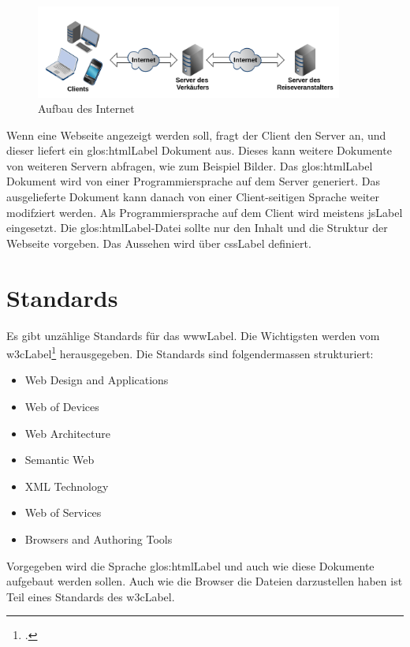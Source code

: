 \begin{figure}[H]
  \centering
  \includegraphics[width=0.9\textwidth]{images/aufbau-internet.png}
  \caption{Aufbau des Internet}
  \label{fig:einfuehrung:aufbau-des-internets}
\end{figure}

Wenn eine Webseite angezeigt werden soll, fragt der Client den Server an, und dieser liefert ein \Gls{glos:htmlLabel} Dokument aus. Dieses kann weitere Dokumente von weiteren Servern abfragen, wie zum Beispiel Bilder.
Das \Gls{glos:htmlLabel} Dokument wird von einer Programmiersprache auf dem Server generiert. Das ausgelieferte Dokument kann danach von einer Client-seitigen Sprache weiter modifziert werden. Als Programmiersprache auf dem Client wird meistens \gls{jsLabel} eingesetzt. Die \Gls{glos:htmlLabel}-Datei sollte nur den Inhalt und die Struktur der Webseite vorgeben. Das Aussehen wird über \gls{cssLabel} definiert.



\section{Standards}
Es gibt unzählige Standards für das \gls{wwwLabel}. Die Wichtigsten werden vom \gls{w3cLabel}\footcite{World_Wide_Web_Consortium_2015-05-30} herausgegeben.
Die Standards sind folgendermassen strukturiert:
\begin{itemize}
\item Web Design and Applications
\item Web of Devices
\item Web Architecture
\item Semantic Web
\item XML Technology
\item Web of Services
\item Browsers and Authoring Tools
\end{itemize}
Vorgegeben wird die Sprache \Gls{glos:htmlLabel} und auch wie diese Dokumente aufgebaut werden sollen. Auch wie die Browser die Dateien darzustellen haben ist Teil eines Standards des \gls{w3cLabel}.

